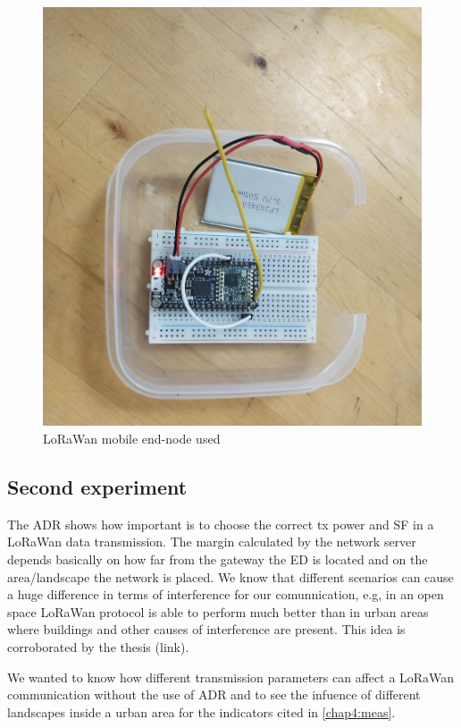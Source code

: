 \begin{figure}[htbp]
    \includegraphics[width=\linewidth]{EndNode0.jpeg}
    \caption{LoRaWan mobile end-node used}
    \label{chap4:endNode0}
\end{figure}

\subsection{Second experiment}
\label{chap4:exp2}

The ADR shows how important is to choose the correct \acrfull{tx power} and SF in a LoRaWan data transmission. The margin 
calculated by the network server depends basically on how far from the gateway the ED is located and on the 
area/landscape the network is placed. We know that different scenarios can cause a huge difference in terms 
of interference for our comunnication, e.g, in an open space LoRaWan protocol is able to perform much better 
than in urban areas where buildings and other causes of interference are present. This idea is corroborated 
by the thesis (link).

We wanted to know how different transmission parameters can affect a LoRaWan communication without the use of ADR
and to see the infuence of different landscapes inside a urban area for the indicators cited in \ref{chap4:meas}.

